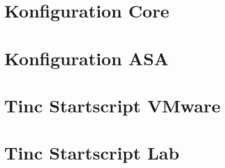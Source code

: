 \documentclass[11pt,a4paper,parskip=half]{scrartcl}
\begin{document}
\section{Konfiguration Core}

\newpage

\section{Konfiguration ASA}

\newpage

\section{Tinc Startscript VMware}
\label{app:tinc-start-esx}

\newpage

\section{Tinc Startscript Lab}
\label{app:tinc-start-lab}

\newpage
\end{document}
